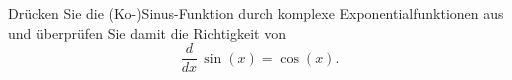 \begin{ExerciseBlock}
Drücken Sie die (Ko-)Sinus-Funktion durch komplexe Exponentialfunktionen aus
und überprüfen Sie damit die Richtigkeit von \[\frac{d}{dx} \, \sin(x) = \cos(x).\]

\end{ExerciseBlock}
